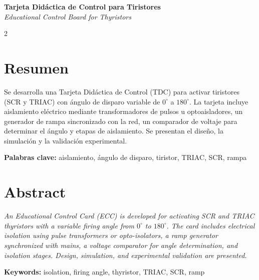 \documentclass[12pt,a4paper]{article}
\begin{document}
\begin{center}
  {\fontsize{16}{18}\bfseries Tarjeta Didáctica de Control para Tiristores}\\[0.5cm]
  {\fontsize{14}{16}\itshape Educational Control Board for Thyristors}\\[1cm] 
  \begin{multicols}{2}




  \end{multicols}
\end{center}

\section*{Resumen}
Se desarrolla una Tarjeta Didáctica de Control (TDC) para activar tiristores (SCR y TRIAC) con ángulo de disparo variable de $0^{\circ}$ a $180^{\circ}$. La tarjeta incluye aislamiento eléctrico mediante transformadores de pulsos u optoaisladores, un generador de rampa sincronizado con la red, un comparador de voltaje para determinar el ángulo y etapas de aislamiento. Se presentan el diseño, la simulación y la validación experimental.

\noindent \textbf{Palabras clave:} aislamiento, ángulo de disparo, tiristor, TRIAC, SCR, rampa

\section*{Abstract}

\emph{An Educational Control Card (ECC) is developed for activating SCR and TRIAC thyristors with a variable firing angle from $0^{\circ}$ to $180^{\circ}$. The card includes electrical isolation using pulse transformers or opto-isolators, a ramp generator synchronized with mains, a voltage comparator for angle determination, and isolation stages. Design, simulation, and experimental validation are presented.}

\noindent \textbf{Keywords:} isolation, firing angle, thyristor, TRIAC, SCR, ramp
\end{document}

